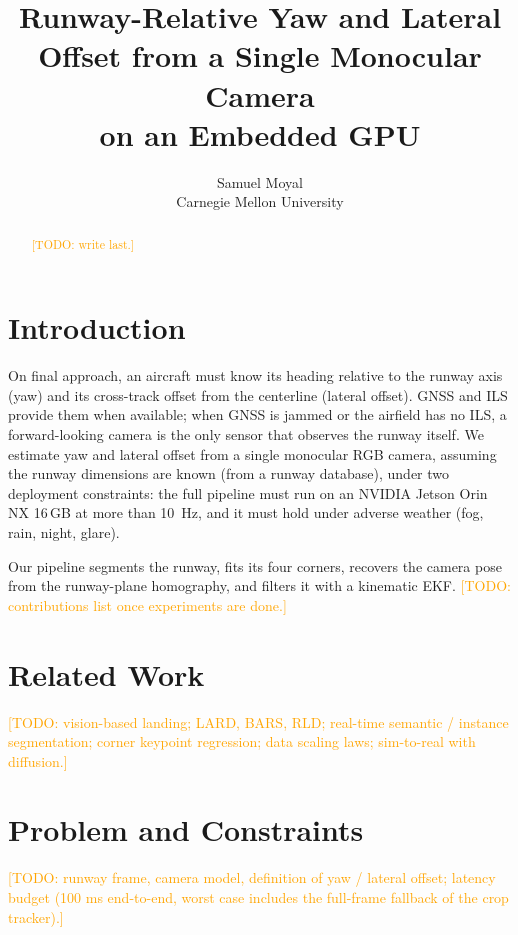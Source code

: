 \documentclass[10pt,twocolumn]{article}
\title{Runway-Relative Yaw and Lateral Offset from a Single Monocular Camera\\on an Embedded GPU}
\author{Samuel Moyal\\Carnegie Mellon University}
\date{}
\newcommand{\todo}[1]{\textcolor{orange}{[TODO: #1]}}
\begin{document}
\maketitle

\begin{abstract}
\todo{write last.}
\end{abstract}

\section{Introduction}
\label{sec:intro}
On final approach, an aircraft must know its heading relative to the runway axis (yaw) and its cross-track offset from the centerline (lateral offset).
GNSS and ILS provide them when available; when GNSS is jammed or the airfield has no ILS, a forward-looking camera is the only sensor that observes the runway itself.
We estimate yaw and lateral offset from a single monocular RGB camera, assuming the runway dimensions are known (from a runway database), under two deployment constraints: the full pipeline must run on an NVIDIA Jetson Orin NX 16\,GB at more than \SI{10}{Hz}, and it must hold under adverse weather (fog, rain, night, glare).

Our pipeline segments the runway, fits its four corners, recovers the camera pose from the runway-plane homography, and filters it with a kinematic EKF.
\todo{contributions list once experiments are done.}

\section{Related Work}
\label{sec:related}
\todo{vision-based landing; LARD, BARS, RLD; real-time semantic / instance segmentation; corner keypoint regression; data scaling laws; sim-to-real with diffusion.}

\section{Problem and Constraints}
\label{sec:problem}
\todo{runway frame, camera model, definition of yaw / lateral offset; latency budget (100 ms end-to-end, worst case includes the full-frame fallback of the crop tracker).}

\end{document}
